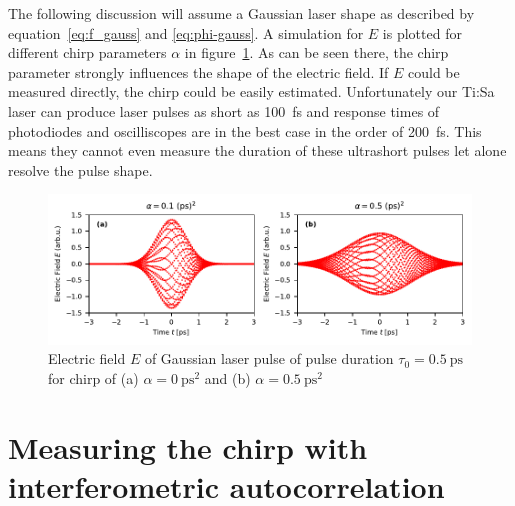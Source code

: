 The following discussion will assume a Gaussian laser shape as described by equation~\eqref{eq:f_gauss} and \eqref{eq:phi-gauss}.
A simulation for $E$ is plotted for different chirp parameters $\alpha$  in figure~\ref{fig:chirpedlaserpulse}.
As can be seen there, the chirp parameter strongly influences the shape of the electric field.
If $E$ could be measured directly, the chirp could be easily estimated.
Unfortunately our Ti:Sa laser can produce laser pulses as short as \SI{100}{\femto \second} and response times of photodiodes and oscilliscopes are in the best case in the order of \SI{200}{\femto \second}.
This means they cannot even measure the duration of these ultrashort pulses let alone resolve the pulse shape.

\begin{figure}[H]
	\centering
	\includegraphics[width=\linewidth]{figures/chirp/plots/chirped_laser_pulse}
	\caption{Electric field $E$ of Gaussian laser pulse of pulse duration $\tau_0=\SI{0.5}{\pico \second}$ for chirp of (a) $\alpha = \SI{0}{\pico \second \squared}$ and (b) $\alpha = \SI{0.5}{\pico \second \squared}$}
	\label{fig:chirpedlaserpulse}
\end{figure}


\section{Measuring the chirp with interferometric autocorrelation}


